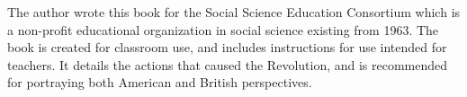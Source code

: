 The author wrote this book for the Social Science Education Consortium which is
a non-profit educational organization in social science existing from 1963. The
book is created for classroom use, and includes instructions for use intended
for teachers.  It details the actions that caused the Revolution, and is
recommended for portraying both American and British perspectives.
